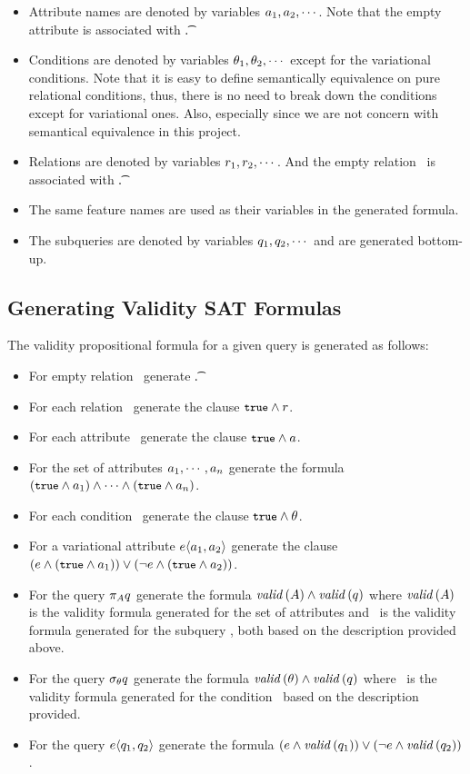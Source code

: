 \documentclass[12pt]{article}
\begin{document}
\begin{itemize}
\item Attribute names are denoted by variables $\att_1, \att_2, \cdots$. Note that the empty attribute is associated with \t.
\item Conditions are denoted by variables $\cond_1, \cond_2, \cdots$ except for the variational conditions.
Note that it is easy to define semantically equivalence on pure relational conditions, thus, there is no need
to break down the conditions except for variational ones. Also, especially since we are not concern with
semantical equivalence in this project.
\item Relations are denoted by variables $\vRel_1, \vRel_2, \cdots$. And the empty relation \empRel\ is associated with \t. 
\item The same feature names are used as their variables in the generated formula. 
\item The subqueries are denoted by variables $\vQ_1, \vQ_2, \cdots$ and are generated bottom-up.
\end{itemize}



\subsection{Generating Validity SAT Formulas}
\label{sec:val}
The validity propositional formula for a given query is generated as follows:

\begin{itemize}
\item For empty relation \empRel\ generate \t.
\item For each relation \vRel\ generate the clause $\t \wedge \vRel$.
\item For each attribute \att\ generate the clause $\t \wedge \att$.
\item For the set of attributes $\att_1, \cdots, \att_n$ generate the formula
$(\t \wedge \att_1) \wedge \cdots \wedge (\t \wedge \att_n)$.
\item For each condition \cond\ generate the clause $\t \wedge \cond$.
\item For a variational attribute $\chc {\att_1, \att_2}$ generate the clause
$(\dimMeta \wedge (\t \wedge \att_1)) \vee (\neg \dimMeta \wedge (\t \wedge \att_2))$.
\item For the query $\vPrj \vQ$ generate the formula 
$\valid {\vAttList} \wedge \valid {\vQ}$ where $\valid \vAttList$ is the validity formula generated for the set 
of attributes and \valid \vQ\ is the validity formula generated for the subquery \vQ, both based 
on the description provided above.
\item For the query $\vSel \vQ$ generate the formula 
$\valid {\cond} \wedge \valid {\vQ}$ where \valid \cond\ is the validity formula generated for the condition \cond\
based on the description provided. 
\item For the query $\chc {\vQ_1, \vQ_2}$ generate the formula
$(\dimMeta \wedge \valid {\vQ_1}) \vee (\neg \dimMeta \wedge \valid {\vQ_2})$.
\end{itemize}
\end{document}
